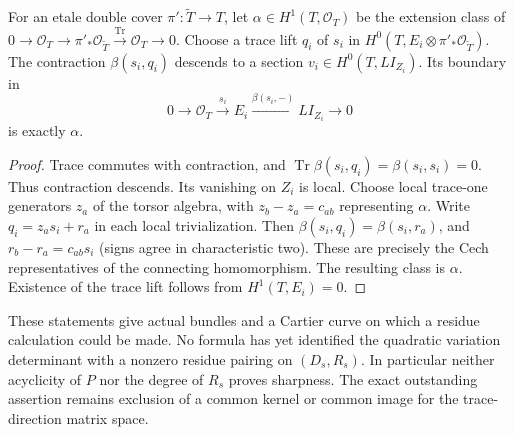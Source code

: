 \begin{lemma}
\label{lem:DE-A3-positive-torsor-boundary}
For an etale double cover $\pi':\widetilde T\to T$, let
$\alpha\in H^1(T,\mathcal O_T)$ be the extension class of
$0\to\mathcal O_T\to\pi'_*\mathcal O_{\widetilde T}
\xrightarrow{\operatorname{Tr}}\mathcal O_T\to0$.
Choose a trace lift $q_i$ of $s_i$ in
$H^0(T,E_i\otimes\pi'_*\mathcal O_{\widetilde T})$.
The contraction $\beta(s_i,q_i)$ descends to a section
$v_i\in H^0(T,L I_{Z_i})$. Its boundary in
\[
 0\longrightarrow\mathcal O_T\xrightarrow{s_i}E_i
       \xrightarrow{\beta(s_i,-)}L I_{Z_i}
       \longrightarrow0
\]
is exactly $\alpha$.
\end{lemma}
\begin{proof}
Trace commutes with contraction, and
$\operatorname{Tr}\beta(s_i,q_i)=\beta(s_i,s_i)=0$.
Thus contraction descends. Its vanishing on $Z_i$ is local.
Choose local trace-one generators $z_a$ of the torsor algebra,
with $z_b-z_a=c_{ab}$ representing $\alpha$.
Write $q_i=z_a s_i+r_a$ in each local trivialization.
Then $\beta(s_i,q_i)=\beta(s_i,r_a)$, and
$r_b-r_a=c_{ab}s_i$ (signs agree in characteristic two).
These are precisely the Cech representatives of the
connecting homomorphism. The resulting class is $\alpha$.
Existence of the trace lift follows from $H^1(T,E_i)=0$.
\end{proof}

\begin{remark}
\label{rem:DE-A3-positive-bundle-scope}
These statements give actual bundles and a Cartier curve on
which a residue calculation could be made. No formula has yet
identified the quadratic variation determinant with a
nonzero residue pairing on $(D_s,R_s)$. In particular neither
acyclicity of $P$ nor the degree of $R_s$ proves sharpness.
The exact outstanding assertion remains exclusion of a common
kernel or common image for the trace-direction matrix space.
\end{remark}
